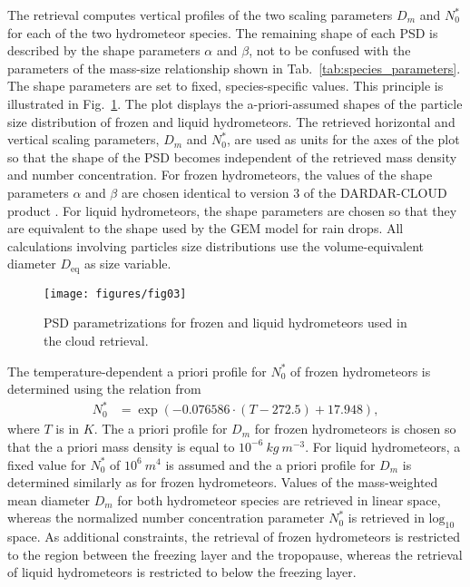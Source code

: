 \documentclass[journal abbreviation, manuscript]{copernicus}
\begin{document}
The retrieval computes vertical profiles of the two scaling parameters $D_m$ and
$N_0^*$ for each of the two hydrometeor species. The remaining shape of each PSD
is described by the shape parameters $\alpha$ and $\beta$, not to
be confused with the parameters of the mass-size relationship shown in
Tab.~\ref{tab:species_parameters}. The shape parameters are set to fixed, species-specific
values. This principle is illustrated in Fig.~\ref{fig:psds_retrieval}.
The plot displays the a-priori-assumed shapes of the particle size distribution
of frozen and liquid hydrometeors. The retrieved horizontal and vertical scaling
parameters, $D_m$ and $N_0^*$, are used as units for the axes of the plot so
that the shape of the PSD becomes independent of the retrieved mass density and
number concentration. For frozen hydrometeors, the values of the shape
parameters $\alpha$ and $\beta$ are chosen identical to version 3 of the
DARDAR-CLOUD product \citep{cazenave18}. For liquid hydrometeors, the shape
parameters are chosen so that they are equivalent to the shape used by the GEM
model for rain drops. All calculations involving particles size distributions
use the volume-equivalent diameter $D_\text{eq}$ as size variable.

\begin{figure}
\centering
\texttt{[image: figures/fig03]}
\caption{PSD parametrizations for frozen and liquid hydrometeors
 used in the cloud retrieval.}
\label{fig:psds_retrieval}
\end{figure}

The temperature-dependent a priori profile for $N_0^*$ of frozen
hydrometeors is determined using the relation from \cite{delanoe14}
%
\begin{align}
N_0^* &= \exp \left ( -0.076586 \cdot (T - 272.5) + 17.948 \right ),
\end{align}
%
where $T$ is in $\unit{K}$. The a priori profile for $D_m$ for frozen
hydrometeors is chosen so that the a priori mass density is equal to
$10^{-6}\ \unit{kg\ m^{-3}}$. For liquid hydrometeors, a fixed value for $N_0^*$ of
$10^6\ \unit{m^4}$ is assumed and the a priori profile for $D_m$ is determined
similarly as for frozen hydrometeors. Values of the mass-weighted mean diameter
$D_m$ for both hydrometeor species are retrieved in linear space, whereas the
normalized number concentration parameter $N_0^*$ is retrieved in
$\text{log}_{10}$ space. As additional constraints, the retrieval of frozen
hydrometeors is restricted to the region between the freezing layer and the
tropopause, whereas the retrieval of liquid hydrometeors is restricted to below
the freezing layer.
\end{document}
